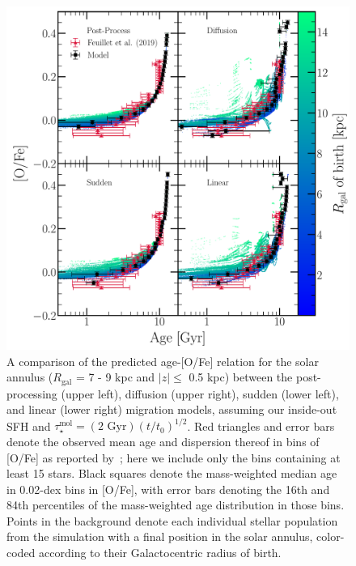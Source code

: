 \documentclass[a4paper, fleqn, usenatbib, useAMS]{mnras}
\begin{document}
\begin{figure} 
\centering 
\includegraphics[scale = 0.5]{age_ofe_migration_comparison.pdf} 
\caption{A comparison of the predicted age-[O/Fe] relation for the solar 
annulus ($R_\text{gal}$ = 7 - 9 kpc and $\left|z\right|\leq$ 0.5 kpc) 
between the post-processing (upper left), diffusion (upper right), sudden 
(lower left), and linear (lower right) migration models, assuming our 
inside-out SFH and $\tau_\star^\text{mol} = (\text{2 Gyr})(t/t_0)^{1/2}$. 
Red triangles and error bars denote the observed mean age and dispersion 
thereof in bins of [O/Fe] as reported by~\citet{Feuillet2019}; here we include 
only the bins containing at least 15 stars. Black squares denote the 
mass-weighted median age in 0.02-dex bins in [O/Fe], with error bars denoting 
the 16th and 84th percentiles of the mass-weighted age distribution in 
those bins. Points in the background denote each individual stellar population 
from the simulation with a final position in the solar annulus, color-coded 
according to their Galactocentric radius of birth. } 
\label{fig:age_alpha_migration_comparison} 
\end{figure} 
\end{document}
